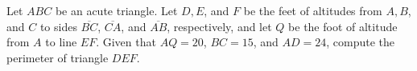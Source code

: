 Let $A B C$ be an acute triangle. Let $D, E$, and $F$ be the feet of altitudes from $A, B$, and $C$ to sides $\overline{B C}$, $\overline{C A}$, and $\overline{A B}$, respectively, and let $Q$ be the foot of altitude from $A$ to line $E F$. Given that $A Q=20$, $B C=15$, and $A D=24$, compute the perimeter of triangle $D E F$.